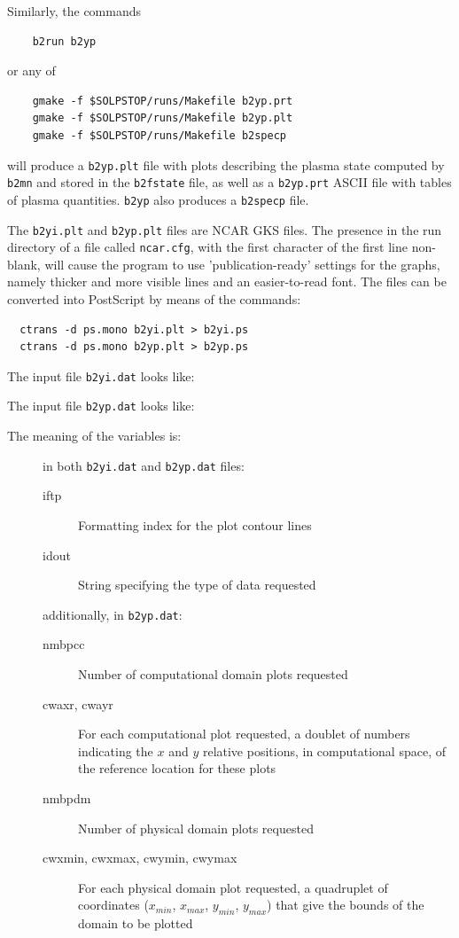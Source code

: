 \documentclass[a4paper,10pt]{report}
\begin{document}
Similarly, the commands
\begin{verbatim}
    b2run b2yp
\end{verbatim}
or any of
\begin{verbatim}
    gmake -f $SOLPSTOP/runs/Makefile b2yp.prt
    gmake -f $SOLPSTOP/runs/Makefile b2yp.plt
    gmake -f $SOLPSTOP/runs/Makefile b2specp
\end{verbatim}
will produce a {\tt b2yp.plt} file with plots describing the plasma state
computed by {\tt b2mn} and stored in the {\tt b2fstate} file, as well as
a {\tt b2yp.prt} ASCII file with tables of plasma quantities. {\tt b2yp}
also produces a {\tt b2specp} file.

The {\tt b2yi.plt} and {\tt b2yp.plt} files are NCAR GKS files. The presence in the
run directory of a file called {\tt ncar.cfg}, with the first character of the first
line non-blank, will cause the program to use 'publication-ready' settings for the
graphs, namely thicker and more visible lines and an easier-to-read font.
The files can be converted into PostScript by means of the commands:
\begin{verbatim}
  ctrans -d ps.mono b2yi.plt > b2yi.ps
  ctrans -d ps.mono b2yp.plt > b2yp.ps
\end{verbatim}

The input file {\tt b2yi.dat} looks like:

The input file {\tt b2yp.dat} looks like:

The meaning of the variables is:
\begin{description}
  \item[] in both {\tt b2yi.dat} and {\tt b2yp.dat} files:
    \begin{description}
      \item[iftp] Formatting index for the plot contour lines
      \item[idout] String specifying the type of data requested
    \end{description}
  \item[] additionally, in {\tt b2yp.dat}:
    \begin{description}
      \item[nmbpcc] Number of computational domain plots requested
  \item[cwaxr, cwayr] For each computational plot requested, a doublet of numbers
indicating the $x$ and $y$ relative positions, in computational space, of the reference
location for these plots
      \item[nmbpdm] Number of physical domain plots requested
      \item[cwxmin, cwxmax, cwymin, cwymax] For each physical domain plot requested, a
quadruplet of coordinates ($x_{min}$, $x_{max}$, $y_{min}$, $y_{max}$) that give
the bounds of the domain to be plotted
    \end{description}
\end{description}
\end{document}
